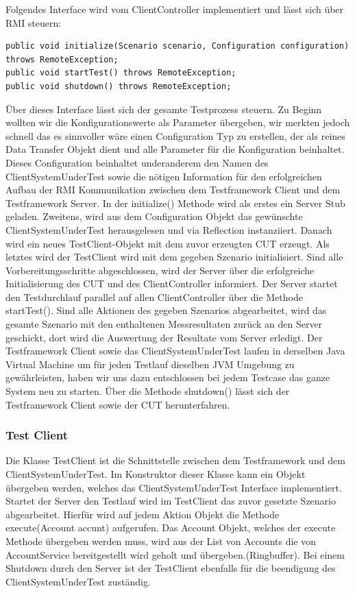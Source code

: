 Folgendes Interface wird vom ClientController implementiert und lässt sich über RMI steuern:
\begin{lstlisting}	
public void initialize(Scenario scenario, Configuration configuration) throws RemoteException;
public void startTest() throws RemoteException;
public void shutdown() throws RemoteException;
\end{lstlisting}
Über dieses Interface lässt sich der gesamte Testprozess steuern. Zu Beginn wollten wir die Konfigurationswerte als Parameter übergeben, wir merkten jedoch schnell das es sinnvoller wäre einen Configuration Typ zu erstellen, der als reines Data Transfer Objekt dient und alle Parameter für die Konfiguration beinhaltet. Dieses Configuration beinhaltet underanderem den Namen des ClientSystemUnderTest sowie die nötigen Information für den erfolgreichen Aufbau der RMI Kommunikation zwischen dem Testframework Client und dem Testframework Server. In der initialize() Methode wird als erstes ein Server Stub geladen. Zweitens, wird aus dem Configuration Objekt das gewünschte ClientSystemUnderTest herausgelesen und via Reflection instanziiert. Danach wird ein neues TestClient-Objekt mit dem zuvor erzeugten CUT erzeugt. Als letztes wird der TestClient wird mit dem gegeben Szenario initialisiert. Sind alle Vorbereitungsschritte abgeschlossen, wird der Server über die erfolgreiche Initialisierung des CUT und des ClientController informiert. Der Server startet den Testdurchlauf parallel auf allen ClientController über die Methode startTest(). Sind alle Aktionen des gegeben Szenarios abgearbeitet, wird das gesamte Szenario mit den enthaltenen Messresultaten zurück an den Server geschickt, dort wird die Auswertung der Resultate vom Server erledigt. Der Testframework Client sowie das ClientSystemUnderTest laufen in derselben Java Virtual Machine um für jeden Testlauf dieselben JVM Umgebung zu gewährleisten, haben wir uns dazu entschlossen bei jedem Testcase das ganze System neu zu starten. Über die Methode shutdown() lässt sich der Testframework Client sowie der CUT herunterfahren.

\subsubsection{Test Client}
\label{sec:testclient}
Die Klasse TestClient ist die Schnittstelle zwischen dem Testframework und dem ClientSystemUnderTest. Im Konstruktor dieser Klasse kann ein Objekt übergeben werden, welches das ClientSystemUnderTest Interface implementiert. Startet der Server den Testlauf wird im TestClient das zuvor gesetzte Szenario abgearbeitet. Hierfür wird auf jedem Aktion Objekt die Methode execute(Account accunt) aufgerufen. Das Account Objekt, welches der execute Methode übergeben werden muss, wird aus der List von Accounts die von AccountService bereitgestellt wird geholt und übergeben.(Ringbuffer). Bei einem Shutdown durch den Server ist der TestClient ebenfalls für die beendigung des ClientSystemUnderTest zuständig.

